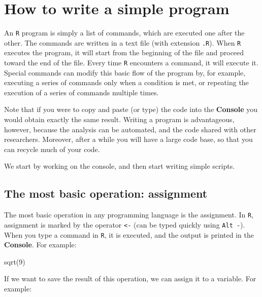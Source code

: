 \documentclass[
  letterpaper,
  DIV=11,
  numbers=noendperiod]{scrreprt}
\newenvironment{Shaded}{\begin{snugshade}}{\end{snugshade}}
\newcommand{\NormalTok}[1]{\textcolor[rgb]{0.00,0.23,0.31}{#1}}
\begin{document}
\section*{How to write a simple
program}\label{how-to-write-a-simple-program}


An \texttt{R} program is simply a list of commands, which are executed
one after the other. The commands are written in a text file (with
extension \texttt{.R}). When \texttt{R} executes the program, it will
start from the beginning of the file and proceed toward the end of the
file. Every time \texttt{R} encounters a command, it will execute it.
Special commands can modify this basic flow of the program by, for
example, executing a series of commands only when a condition is met, or
repeating the execution of a series of commands multiple times.

Note that if you were to copy and paste (or type) the code into the
\textbf{Console} you would obtain exactly the same result. Writing a
program is advantageous, however, because the analysis can be automated,
and the code shared with other researchers. Moreover, after a while you
will have a large code base, so that you can recycle much of your code.

We start by working on the console, and then start writing simple
scripts.

\subsection*{The most basic operation:
assignment}\label{the-most-basic-operation-assignment}

The most basic operation in any programming language is the assignment.
In \texttt{R}, assignment is marked by the operator
\texttt{\textless{}-} (can be typed quickly using \texttt{Alt\ -}). When
you type a command in \texttt{R}, it is executed, and the output is
printed in the \textbf{Console}. For example:

\begin{Shaded}
\begin{Highlighting}[]
\NormalTok{sqrt(9)}
\end{Highlighting}
\end{Shaded}

If we want to save the result of this operation, we can assign it to a
variable. For example:
\end{document}
